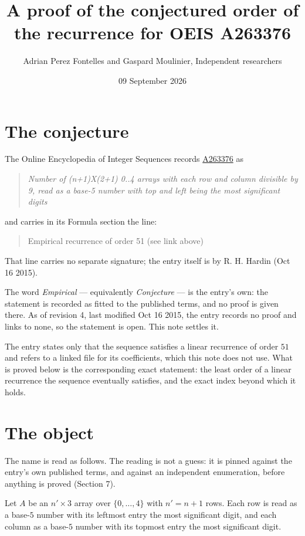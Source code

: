 \documentclass[11pt]{article}
\title{A proof of the conjectured order of the recurrence for OEIS A263376}
\author{Adrian Perez Fontelles and Gaspard Moulinier, Independent researchers}
\date{09 September 2026}
\theoremstyle{definition}
\begin{document}
\maketitle
\section{The conjecture}

The Online Encyclopedia of Integer Sequences records \href{https://oeis.org/A263376}{A263376} as

\begin{quote}\itshape Number of (n+1)X(2+1) 0..4 arrays with each row and column divisible by 9, read as a base-5 number with top and left being the most significant digits\end{quote}

and carries in its Formula section the line:

\begin{quote}\ttfamily Empirical recurrence of order 51 (see link above)\end{quote}

That line carries no separate signature; the entry itself is by R. H. Hardin (Oct 16 2015).

The word {\itshape Empirical} --- equivalently {\itshape Conjecture} --- is the entry's own: the statement is recorded as fitted to the published terms, and no proof is given there. As of revision 4, last modified Oct 16 2015, the entry records no proof and links to none, so the statement is open. This note settles it.

The entry states only that the sequence satisfies a linear recurrence of order $51$ and refers to a linked file for its coefficients, which this note does not use. What is proved below is the corresponding exact statement: the least order of a linear recurrence the sequence eventually satisfies, and the exact index beyond which it holds.

\section{The object}

The name is read as follows. The reading is not a guess: it is pinned against the entry's own published terms, and against an independent enumeration, before anything is proved (Section 7).

Let $A$ be an $n' \times 3$ array over $\{0,\dots,4\}$ with $n' = n + 1$ rows. Each row is read as a base-$5$ number with its leftmost entry the most significant digit, and each column as a base-$5$ number with its topmost entry the most significant digit.
\end{document}
